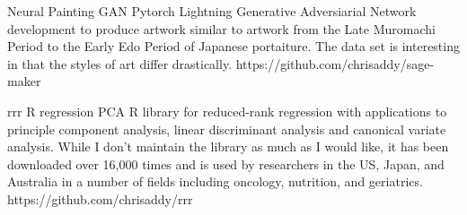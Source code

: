 
\begin{cvprojects}

\cvproject
{Neural Painting}
{GAN \textbullet{} Pytorch Lightning}
{
Generative Adversiarial Network development to produce artwork similar to artwork from the Late Muromachi Period to the Early Edo Period of Japanese portaiture. The data set is interesting in that the styles of art differ drastically.
    \vspace{2mm} %
}
{https://github.com/chrisaddy/sage-maker}


\cvproject
{rrr}
{R \textbullet{} regression \textbullet{} PCA}
{
R library for reduced-rank regression with applications to principle component analysis, linear discriminant analysis and canonical variate analysis. While I don't maintain the library as much as I would like, it has been downloaded over 16,000 times and is used by researchers in the US, Japan, and Australia in a number of fields including oncology, nutrition, and geriatrics.
}
{https://github.com/chrisaddy/rrr}


\end{cvprojects}
